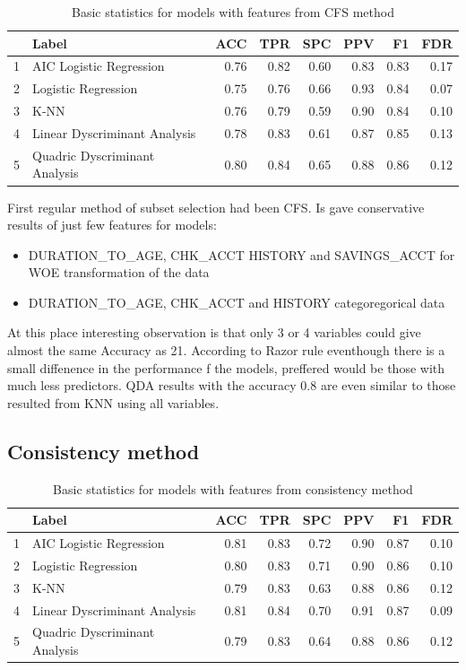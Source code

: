 \documentclass[10pt]{article}\usepackage[]{graphicx}\usepackage[]{color}
\begin{document}
\begin{table}[ht]
\centering
\begin{tabular}{rlrrrrrr}
\hline
& Label & ACC & TPR & SPC & PPV & F1 & FDR \\ 
\hline
1 & AIC Logistic Regression & 0.76 & 0.82 & 0.60 & 0.83 & 0.83 & 0.17 \\ 
2 & Logistic Regression & 0.75 & 0.76 & 0.66 & 0.93 & 0.84 & 0.07 \\ 
3 & K-NN & 0.76 & 0.79 & 0.59 & 0.90 & 0.84 & 0.10 \\ 
4 & Linear Dyscriminant Analysis & 0.78 & 0.83 & 0.61 & 0.87 & 0.85 & 0.13 \\ 
5 & Quadric Dyscriminant Analysis & 0.80 & 0.84 & 0.65 & 0.88 & 0.86 & 0.12 \\ 
\hline
\end{tabular}
\caption{Basic statistics for models with features from CFS method} 
\end{table}

First regular method of subset selection had been CFS. Is gave conservative results of just few features for models:
\begin{itemize}
\item DURATION\_TO\_AGE, CHK\_ACCT HISTORY and SAVINGS\_ACCT for WOE transformation of the data
\item DURATION\_TO\_AGE, CHK\_ACCT and HISTORY categoregorical data
\end{itemize}

At this place interesting observation is that only 3 or 4 variables could give almost the same Accuracy as 21. According to Razor rule eventhough there is a small diffenence in the performance f the models, preffered would be those with much less predictors. QDA results with the accuracy 0.8 are even similar to those resulted from KNN using all variables.

\clearpage

\subsection{Consistency method}

\begin{table}[ht]
\centering
\begin{tabular}{rlrrrrrr}
\hline
& Label & ACC & TPR & SPC & PPV & F1 & FDR \\ 
\hline
1 & AIC Logistic Regression & 0.81 & 0.83 & 0.72 & 0.90 & 0.87 & 0.10 \\ 
2 & Logistic Regression & 0.80 & 0.83 & 0.71 & 0.90 & 0.86 & 0.10 \\ 
3 & K-NN & 0.79 & 0.83 & 0.63 & 0.88 & 0.86 & 0.12 \\ 
4 & Linear Dyscriminant Analysis & 0.81 & 0.84 & 0.70 & 0.91 & 0.87 & 0.09 \\ 
5 & Quadric Dyscriminant Analysis & 0.79 & 0.83 & 0.64 & 0.88 & 0.86 & 0.12 \\ 
\hline
\end{tabular}
\caption{Basic statistics for models with features from consistency method} 
\end{table}
\end{document}
